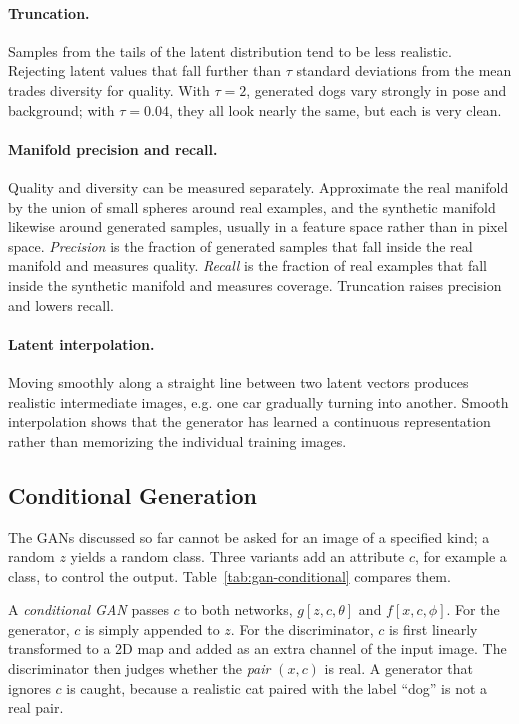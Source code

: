 \paragraph{Truncation.}
Samples from the tails of the latent distribution tend to be less realistic.
Rejecting latent values that fall further than $\tau$ standard deviations from
the mean trades diversity for quality. With $\tau=2$, generated dogs vary
strongly in pose and background; with $\tau=0.04$, they all look nearly the
same, but each is very clean.

\paragraph{Manifold precision and recall.}
Quality and diversity can be measured separately. Approximate the real
manifold by the union of small spheres around real examples, and the synthetic
manifold likewise around generated samples, usually in a feature space rather
than in pixel space. \emph{Precision} is the fraction of generated samples that
fall inside the real manifold and measures quality. \emph{Recall} is the
fraction of real examples that fall inside the synthetic manifold and measures
coverage. Truncation raises precision and lowers recall.

\paragraph{Latent interpolation.}
Moving smoothly along a straight line between two latent vectors produces
realistic intermediate images, e.g. one car gradually turning into another.
Smooth interpolation shows that the generator has learned a continuous
representation rather than memorizing the individual training images.

\subsection{Conditional Generation}

The GANs discussed so far cannot be asked for an image of a specified kind; a
random $z$ yields a random class. Three variants add an attribute $c$, for
example a class, to control the output. Table~\ref{tab:gan-conditional}
compares them.

A \emph{conditional GAN} passes $c$ to both networks, $g[z,c,\theta]$ and
$f[x,c,\phi]$. For the generator, $c$ is simply appended to $z$. For the
discriminator, $c$ is first linearly transformed to a 2D map and added as an
extra channel of the input image. The discriminator then judges whether the
\emph{pair} $(x,c)$ is real. A generator that ignores $c$ is caught, because a
realistic cat paired with the label ``dog'' is not a real pair.

